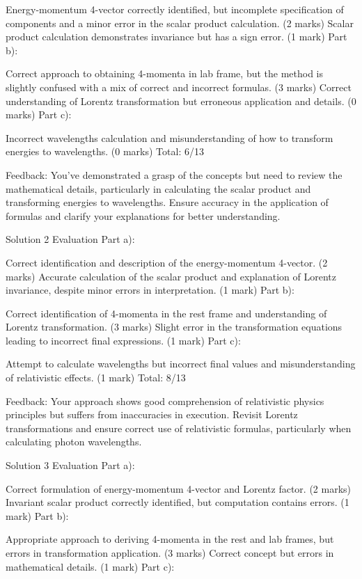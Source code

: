 \documentclass[a4paper,11pt]{article}
\begin{document}
Energy-momentum 4-vector correctly identified, but incomplete specification of components and a minor error in the scalar product calculation. (2 marks)
Scalar product calculation demonstrates invariance but has a sign error. (1 mark)
Part b):

Correct approach to obtaining 4-momenta in lab frame, but the method is slightly confused with a mix of correct and incorrect formulas. (3 marks)
Correct understanding of Lorentz transformation but erroneous application and details. (0 marks)
Part c):

Incorrect wavelengths calculation and misunderstanding of how to transform energies to wavelengths. (0 marks)
Total: 6/13

Feedback: You've demonstrated a grasp of the concepts but need to review the mathematical details, particularly in calculating the scalar product and transforming energies to wavelengths. Ensure accuracy in the application of formulas and clarify your explanations for better understanding.

Solution 2 Evaluation
Part a):

Correct identification and description of the energy-momentum 4-vector. (2 marks)
Accurate calculation of the scalar product and explanation of Lorentz invariance, despite minor errors in interpretation. (1 mark)
Part b):

Correct identification of 4-momenta in the rest frame and understanding of Lorentz transformation. (3 marks)
Slight error in the transformation equations leading to incorrect final expressions. (1 mark)
Part c):

Attempt to calculate wavelengths but incorrect final values and misunderstanding of relativistic effects. (1 mark)
Total: 8/13

Feedback: Your approach shows good comprehension of relativistic physics principles but suffers from inaccuracies in execution. Revisit Lorentz transformations and ensure correct use of relativistic formulas, particularly when calculating photon wavelengths.

Solution 3 Evaluation
Part a):

Correct formulation of energy-momentum 4-vector and Lorentz factor. (2 marks)
Invariant scalar product correctly identified, but computation contains errors. (1 mark)
Part b):

Appropriate approach to deriving 4-momenta in the rest and lab frames, but errors in transformation application. (3 marks)
Correct concept but errors in mathematical details. (1 mark)
Part c):
\end{document}
